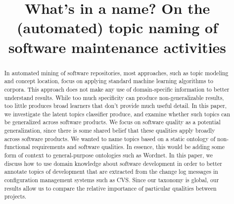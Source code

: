 \documentclass[10pt, conference, compsocconf]{IEEEtran}
\begin{document}
 
\author{
\and
{}

}


\title{What's in a name? On the (automated) topic naming of software maintenance activities}

\maketitle
\thispagestyle{empty}

\begin{abstract}
  In automated mining of software repositories, most approaches, such as topic modeling and concept location, focus on applying standard machine learning algorithms to corpora. This approach does not make any use of domain-specific information to better understand results. While too much specificity can produce non-generalizable results, too little produces broad learners that don't provide much useful detail.%
In this paper, we investigate the latent topics classifier produce, and examine  whether such topics can be
  generalized across software products. We focus on software quality
  as a potential generalization, since there is some shared belief
  that these qualities apply broadly across software products. We
  wanted to name topics based on a static ontology of non-functional
  requirements and software qualities. %
In essence, this would be adding some form
  of context to general-purpose ontologies such as Wordnet. In this
  paper, we discuss how to use domain knowledge about software
  development in order to better annotate topics of development that
  are extracted from the change log messages in configuration
  management systems such as CVS. Since our taxonomy is global, our results allow us to compare the relative importance of particular qualities between projects.
\end{abstract}
\end{document}
